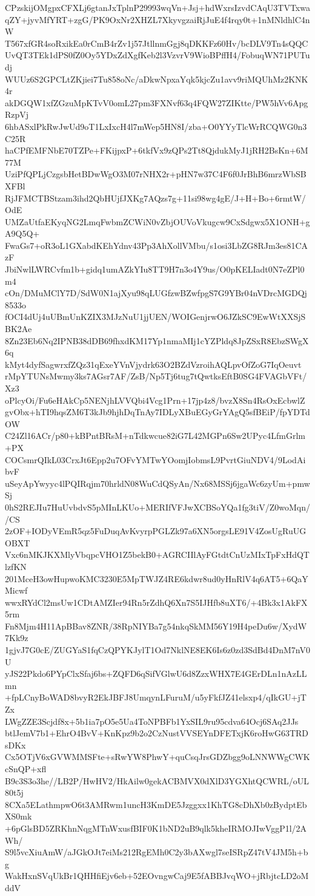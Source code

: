 CPzskijOMgpxCFXLj6gtanJxTplnP29993wqVn+Jsj+hdWxrsIzvdCAqU3TVTxwa
qZY+jyvMfYRT+zgG/PK9OxNr2XHZL7XkyvgzaiRjJuE4f4rqy0t+1nMNldhlC4nW
T567xfGR4soRxikEa0rCmB4rZv1j57JtllnmGgj8qDKKFz60Hv/bcDLV9Tn4sQQC
UvQT3TEk1dPS0fZ0Oy5YDxZdXgfKeb2l3VzvrV9WioBPffH4/FobuqWN71PUTudj
WUUz6S2GPCLtZKjiei7Tu858oNc/aDkwNpxaYqk5kjcZu1avv9riMQUhMz2KNK4r
akDGQW1xfZGzuMpKTvV0omL27pm3FXNvf63q4FQW27ZIKtte/PW5hVv6ApgRzpVj
6hbASxlPkRwJwUd9oT1LxIxcH4l7mWep5HN8I/zba+O0YYyTlcWrRCQWG0n3C25R
haCPfEMFNbE70TZPe+FKijpxP+6tkfVx9zQPs2Tt8QjdukMyJ1jRH2BsKn+6M77M
UziPfQPLjCzgsbHetBDwWgO3M07rNHX2r+pHN7w37C4F6f0JrBhB6mrzWbSBXFBl
RjJFMCTBStzam3ihd2QbHUjfJXKg7AQzs7g+11si98wg4gE/J+H+Bo+6rmtW/OdE
UMZaUtfaEKyqNG2LmqFwbmZCWiN0vZbjOUVoVkugcw9CxSdgwx5X1ONH+gA9Q5Q+
FwaGs7+oR3oL1GXabdKEhYdnv43Pp3AhXollVMbu/s1osi3LbZG8RJm3es81CAzF
JbiNwlLWRCvfm1b+gidq1umAZkYIu8TT9H7n3o4Y9us/O0pKELIadt0N7eZPl0m4
cOn/DMuMClY7D/SdW0N1ajXyu98qLUGfzwBZwfpgS7G9YBr04nVDrcMGDQj8533o
fOCI4dUj4uUBmUnKZIX3MJzNuU1jjUEN/WOIGenjrwO6JZkSC9EwWtXXSjSBK2Ae
8Zn23Eb6Nq2IPNB38dDB69fhxdKM17Yp1nmaMIj1cYZPldq8JpZSxR8EbzSWgX6q
kMyt4dyfSagwrxfZQz31qExeYVnVjydrk63O2BZdVzroihAQLpvOfZoG7IqOeuvt
rMpYTUNsMwmy3ks7AGsr7AF/ZsB/Np5Tj6tug7tQwtksEftB0SG4FVAGbVFt/Xz3
oPlcyOi/Fu6eHAkCp5NENjhLVVQbi4Vcg1Prn+17jp4z8/bvzX8Sn4RsOxEcbwlZ
gvObx+hTI9hqsZM6T3kJb9hjhDqTnAy7IDLyXBuEGyGrYAgQ5sfBEiP/fpYDTdOW
C24Zl16ACr/p80+kBPntBRsM+nTdkwcue82iG7L42MGPn6Sw2UPyc4LfmGrlm+PX
COCsmrQIkL03CrxJt6Epp2u7OFvYMTwYOomjIobmsL9PvrtGiuNDV4/9LodAibvF
uSeyApYwyyc4lPQIRqjm70hrldN08WuCdQSyAn/Nx68MSSj6jgaWc6zyUm+pmwSj
0hS2REJIu7HuUvbdvS5pMInLKUo+MERIfVFJwXCBSoYQa1fg3tiV/Z0woMqn//CS
2zOF+IODyVEmR5qz5FuDuqAvKvyrpPGLZk97a6XN5orgsLE91V4ZosUgRuUGOBXT
Vxc6nMKJKXMlyVbqpcVHO1Z5bekB0+AGRCIIlAyFGtdtCnUzMIxTpFxHdQTlzfKN
201MceH3owHupwoKMC3230E5MpTWJZ4RE6kdwr8ud0yHnRlV4q6AT5+6QaYMicwf
wwxRYdCl2msUw1CDtAMZIer94Rn5rZdhQ6Xn7S5IJHfb8uXT6/+4Bk3x1AkFX5rm
Fn8Mjm4H11ApBBav8ZNR/38RpNIYBa7g54nkqSkMM56Y19H4peDu6w/XydW7Kk9z
1gjvJ7G0cE/ZUGYaS1fqCzQPYKJylT1Od7NklNE8EK6Is6z0zd3SdBd4DnM7nV0U
yJS22Pkdo6PYpClxSfaj6bs+ZQFD6qSifVGlwU6d8ZzxWHX7E4GErDLn1nAzLLmn
+fpLCnyBoWAD8bvyR2EkJBFJ8UmqynLFuruM/u5yFkfJZ41elsxp4/qIkGU+jTZx
LWgZZE3Scjdf8x+5b1ia7pO5e5Ua4ToNPBFb1YxSIL9ru95cdva64Ocj6SAq2JJs
btlJemV7b1+EhrO4BvV+KnKpz9b2o2CzNustVVSEYnDFETxjK6roHwG63TRDsDKx
Cx5OTjV6xGVWMMSFte+sRwYW8PhwY+quCsqJrsGDZbgg9oLNNWWgCWKcSnQP+xfl
B9c3S3o3he//LB2P/HwHV2/HkAilw0gekACBMVX0dXlD3YGXhtQCWRL/oUL80t5j
8CXa5ELathmpwO6t3AMRwm1uncH3KmDE5Jzggxx1KhTG8cDhXb0zBydptEbXS0mk
+6pGlsBD5ZRKhnNqgMTnWxusfBIF0K1bND2uB9qlk5kheIRMOJIwVggP1l/2AWh/
S9l5vcXiuAmW/aJGkOJt7eiMs212RgEMh0C2y3bAXwgl7seISRpZ47tV4JM5h+bg
WakHxnSVqUkBr1QHHfiEjv6eb+52EOvngwCaj9E5fABBJvqWO+jRbjtcLD2oMddV

